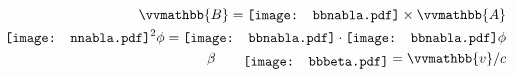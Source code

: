 \documentclass[paper=a4, fontsize=12pt, line_length=16cm, number_of_lines=33,dvipdfmx]{jlreq}
\newcommand{\Ab}{{\vvmathbb{A}}}
\newcommand{\Bb}{{\vvmathbb{B}}}
\newcommand{\bbnabla}{\raisebox{-0.05ex}{\texttt{[image: bbnabla.pdf]}}}
\newcommand{\nnabla}{\raisebox{-0.05ex}{\texttt{[image: nnabla.pdf]}}}
\newcommand{\bbbeta}{\raisebox{-0.5ex}{\texttt{[image: bbbeta.pdf]}}}
\begin{document}
\begin{align}
  \Bb = \bbnabla \times \Ab\\
  \nnabla^2 \phi = \bbnabla\cdot \bbnabla \phi \\
  \beta\qquad\bbbeta= \vvmathbb{v}/c
\end{align}
\end{document}
